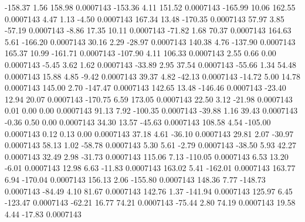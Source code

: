      -158.37        1.56      158.98     0.0007143
     -153.36        4.11      151.52     0.0007143
     -165.99       10.06      162.55     0.0007143
        4.47        1.13       -4.50     0.0007143
      167.34       13.48     -170.35     0.0007143
       57.97        3.85      -57.19     0.0007143
       -8.86       17.35       10.11     0.0007143
      -71.82        1.68       70.37     0.0007143
      164.63        5.61     -166.20     0.0007143
       30.16        2.29      -28.97     0.0007143
      140.38        4.76     -137.90     0.0007143
      165.37       10.99     -161.71     0.0007143
     -107.90        4.11      106.33     0.0007143
        2.55        0.66        0.00     0.0007143
       -5.45        3.62        1.62     0.0007143
      -33.89        2.95       37.54     0.0007143
      -55.66        1.34       54.48     0.0007143
       15.88        4.85       -9.42     0.0007143
       39.37        4.82      -42.13     0.0007143
      -14.72        5.00       14.78     0.0007143
      145.00        2.70     -147.47     0.0007143
      142.65       13.48     -146.46     0.0007143
      -23.40       12.94       20.07     0.0007143
     -170.75        6.59      173.05     0.0007143
       22.50        3.12      -21.98     0.0007143
        0.01        0.00        0.00     0.0007143
       91.13        7.92     -100.35     0.0007143
      -39.88        1.16       39.43     0.0007143
       -0.36        0.50        0.00     0.0007143
       34.30       13.57      -45.63     0.0007143
      108.58        4.54     -105.00     0.0007143
        0.12        0.13        0.00     0.0007143
       37.18        4.61      -36.10     0.0007143
       29.81        2.07      -30.97     0.0007143
       58.13        1.02      -58.78     0.0007143
        5.30        5.61       -2.79     0.0007143
      -38.50        5.93       42.27     0.0007143
       32.49        2.98      -31.73     0.0007143
      115.06        7.13     -110.05     0.0007143
        6.53       13.20       -6.01     0.0007143
       12.98        6.63      -11.83     0.0007143
      163.02        5.41     -162.01     0.0007143
      163.77        6.94     -170.04     0.0007143
      156.13        2.06     -155.80     0.0007143
      148.36        7.77     -148.73     0.0007143
      -84.49        4.10       81.67     0.0007143
      142.76        1.37     -141.94     0.0007143
      125.97        6.45     -123.47     0.0007143
      -62.21       16.77       74.21     0.0007143
      -75.44        2.80       74.19     0.0007143
       19.58        4.44      -17.83     0.0007143
